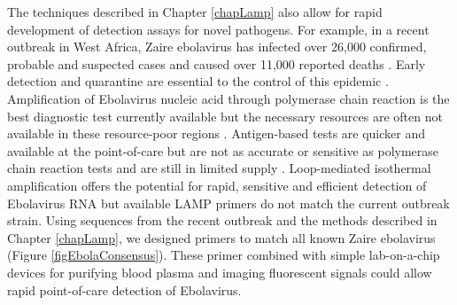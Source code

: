 \documentclass[../sherrill-Mix_thesis.tex]{subfiles}
\begin{document}
		The techniques described in Chapter \ref{chapLamp} also allow for rapid development of detection assays for novel pathogens. For example, in a recent outbreak in West Africa, Zaire ebolavirus has infected over 26,000 confirmed, probable and suspected cases and caused over 11,000 reported deaths \citep{Gire2014,WHOERT2014,WHO2015}. Early detection and quarantine are essential to the control of this epidemic \citep{Chowell2014}. Amplification of Ebolavirus nucleic acid through polymerase chain reaction is the best diagnostic test currently available but the necessary resources are often not available in these resource-poor regions \citep{Fauci2014,WHO2015a}. Antigen-based tests are quicker and available at the point-of-care but are not as accurate or sensitive as polymerase chain reaction tests and are still in limited supply \citep{WHO2015a}.  Loop-mediated isothermal amplification offers the potential for rapid, sensitive and efficient detection of Ebolavirus RNA but available LAMP primers \citep{Kurosaki2007} do not match the current outbreak strain. Using sequences from the recent outbreak \citep{Gire2014,Hoenen2015} and the methods described in Chapter \ref{chapLamp}, we designed primers to match all known Zaire ebolavirus (Figure \ref{figEbolaConsensus}). These primer combined with simple lab-on-a-chip devices for purifying blood plasma \citep{Liu2013} and imaging fluorescent signals \citep{Liu2011,Liu2014a} could allow rapid point-of-care detection of Ebolavirus.
\end{document}
